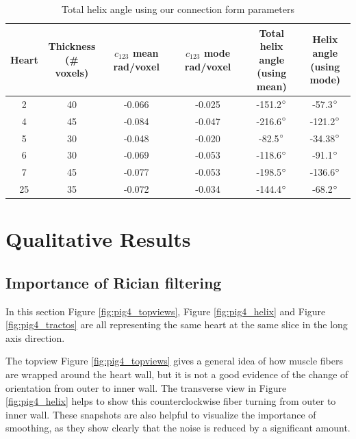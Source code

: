 \begin{table}
    \centering
    \begin{tabular}{|c | c | c | c| c| c|} 
         \hline
         Heart & \shortstack{Thickness \\ (\# voxels)} & \shortstack{$c_{123}$ mean \\ rad/voxel} & \shortstack{$c_{123}$ mode \\ rad/voxel} & \shortstack{Total helix angle \\ (using mean)} & \shortstack{Helix angle \\ (using mode)}\\
         \hline
         2 & 40 & -0.066 & -0.025 & -151.2$^{\circ}$ & -57.3$^{\circ}$ \\ 
         \hline
         4 & 45 & -0.084 & -0.047 & -216.6$^{\circ}$ & -121.2$^{\circ}$ \\
         \hline
         5 & 30 & -0.048 & -0.020 & -82.5$^{\circ}$ & -34.38$^{\circ}$ \\
         \hline
         6 & 30 & -0.069 & -0.053 & -118.6$^{\circ}$ & -91.1$^{\circ}$ \\
         \hline
         7 & 45 & -0.077 & -0.053 & -198.5$^{\circ}$ & -136.6$^{\circ}$ \\ 
         \hline
         25 & 35 & -0.072 & -0.034 & -144.4$^{\circ}$ & -68.2$^{\circ}$ \\
         \hline
    \end{tabular}
    \caption{Total helix angle using our connection form parameters}
\end{table}


\section{Qualitative Results}

\subsection{Importance of Rician filtering}

In this section Figure \ref{fig:pig4_topviews}, Figure \ref{fig:pig4_helix} and Figure \ref{fig:pig4_tractos} are all representing the same heart at the same slice in the long axis direction.

The topview Figure \ref{fig:pig4_topviews} gives a general idea of how muscle fibers are wrapped around the heart wall, but it is not a good evidence of the change of orientation from outer to inner wall. The transverse view in Figure \ref{fig:pig4_helix} helps to show this counterclockwise fiber turning from outer to inner wall. These snapshots are also helpful to visualize the importance of smoothing, as they show clearly that the noise is reduced by a significant amount.

